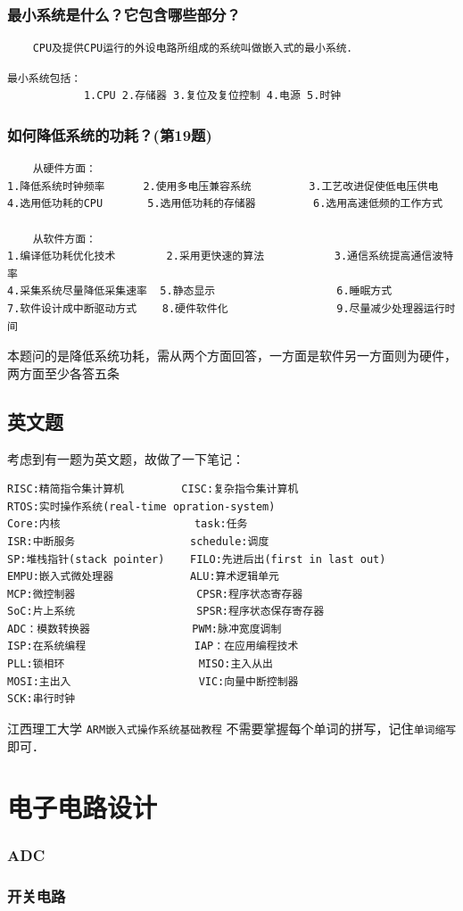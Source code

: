 \documentclass[cn,11pt]{elegantbook}
\begin{document}
\subsection{最小系统是什么？它包含哪些部分？}
\begin{lstlisting}
	CPU及提供CPU运行的外设电路所组成的系统叫做嵌入式的最小系统．
\end{lstlisting}
\begin{lstlisting}
最小系统包括：
			1.CPU 2.存储器 3.复位及复位控制 4.电源 5.时钟
\end{lstlisting}

\subsection{如何降低系统的功耗？(第19题)}
\begin{lstlisting}
	从硬件方面：
1.降低系统时钟频率		2.使用多电压兼容系统			3.工艺改进促使低电压供电
4.选用低功耗的CPU		  5.选用低功耗的存储器		  6.选用高速低频的工作方式

	从软件方面：
1.编译低功耗优化技术		   2.采用更快速的算法			3.通信系统提高通信波特率
4.采集系统尽量降低采集速率	5.静态显示				     6.睡眠方式
7.软件设计成中断驱动方式	 8.硬件软件化				 9.尽量减少处理器运行时间
\end{lstlisting}
\begin{note}
本题问的是降低系统功耗，需从两个方面回答，一方面是软件另一方面则为硬件，两方面至少各答五条
\end{note}



\section{英文题}
考虑到有一题为英文题，故做了一下笔记：
\begin{lstlisting}
RISC:精简指令集计算机         CISC:复杂指令集计算机
RTOS:实时操作系统(real-time opration-system)
Core:内核						task:任务
ISR:中断服务				  schedule:调度
SP:堆栈指针(stack pointer)    FILO:先进后出(first in last out)
EMPU:嵌入式微处理器			ALU:算术逻辑单元
MCP:微控制器				   CPSR:程序状态寄存器
SoC:片上系统				   SPSR:程序状态保存寄存器
ADC：模数转换器				 PWM:脉冲宽度调制
ISP:在系统编程				  IAP：在应用编程技术
PLL:锁相环						MISO:主入从出
MOSI:主出入					VIC:向量中断控制器
SCK:串行时钟
\end{lstlisting}


\begin{remark}
	江西理工大学 \lstinline{ARM嵌入式操作系统基础教程}      不需要掌握每个单词的拼写，记住\lstinline{单词缩写}即可．

\end{remark}


\chapter{电子电路设计}
\subsection{ADC}

\subsection{开关电路}
\end{document}
